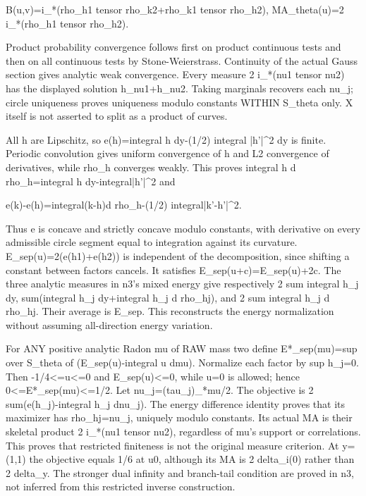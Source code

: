 \documentclass[11pt]{article}
\begin{document}
B(u,v)=i\_*(rho\_h1 tensor rho\_k2+rho\_k1 tensor rho\_h2),
MA\_theta(u)=2 i\_*(rho\_h1 tensor rho\_h2).

Product probability convergence follows first on product continuous tests and then on all continuous tests by Stone-Weierstrass. Continuity of the actual Gauss section gives analytic weak convergence. Every measure 2 i\_*(nu1 tensor nu2) has the displayed solution h\_nu1+h\_nu2. Taking marginals recovers each nu\_j; circle uniqueness proves uniqueness modulo constants WITHIN S\_theta only. X itself is not asserted to split as a product of curves.

All h are Lipschitz, so e(h)=integral h dy-(1/2) integral |h'|\textasciicircum{}2 dy is finite. Periodic convolution gives uniform convergence of h and L2 convergence of derivatives, while rho\_h converges weakly. This proves integral h d rho\_h=integral h dy-integral|h'|\textasciicircum{}2 and

e(k)-e(h)=integral(k-h)d rho\_h-(1/2) integral|k'-h'|\textasciicircum{}2.

Thus e is concave and strictly concave modulo constants, with derivative on every admissible circle segment equal to integration against its curvature. E\_sep(u)=2(e(h1)+e(h2)) is independent of the decomposition, since shifting a constant between factors cancels. It satisfies E\_sep(u+c)=E\_sep(u)+2c. The three analytic measures in n3's mixed energy give respectively 2 sum integral h\_j dy, sum(integral h\_j dy+integral h\_j d rho\_hj), and 2 sum integral h\_j d rho\_hj. Their average is E\_sep. This reconstructs the energy normalization without assuming all-direction energy variation.

For ANY positive analytic Radon mu of RAW mass two define E*\_sep(mu)=sup over S\_theta of (E\_sep(u)-integral u dmu). Normalize each factor by sup h\_j=0. Then -1/4<=u<=0 and E\_sep(u)<=0, while u=0 is allowed; hence 0<=E*\_sep(mu)<=1/2. Let nu\_j=(tau\_j)\_*mu/2. The objective is 2 sum(e(h\_j)-integral h\_j dnu\_j). The energy difference identity proves that its maximizer has rho\_hj=nu\_j, uniquely modulo constants. Its actual MA is their skeletal product 2 i\_*(nu1 tensor nu2), regardless of mu's support or correlations. This proves that restricted finiteness is not the original measure criterion. At y=(1,1) the objective equals 1/6 at u0, although its MA is 2 delta\_i(0) rather than 2 delta\_y. The stronger dual infinity and branch-tail condition are proved in n3, not inferred from this restricted inverse construction.
\end{document}
